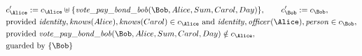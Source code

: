 \begin{align*}
&
c'_
{
\Alice
}
 := 
c_
{
\Alice
}
 \uplus 
\{
\mathit{\detokenize{
vote_pay_bond_bob
}}
(
\Bob
,
Alice
,
Sum
,
Carol
,
Day
)
\}
, \qquad 
c'_
{
\Bob
}
 := 
c_
{
\Bob
}
,\\
&
\text{provided } 
\mathit{\detokenize{
identity
}}
,
\mathit{\detokenize{
knows
}}
(
Alice
)
,
\mathit{\detokenize{
knows
}}
(
Carol
)
 \in c_
{
\Alice
}
 \text{ and } 
\mathit{\detokenize{
identity
}}
,
\mathit{\detokenize{
officer
}}
(
\Alice
)
,
\mathit{\detokenize{
person
}}
 \in c_
{
\Bob
}
,\\
&
\text{provided } 
\mathit{\detokenize{
vote_pay_bond_bob
}}
(
\Bob
,
Alice
,
Sum
,
Carol
,
Day
)
 \notin c_
{
\Alice
}
,\\
&
\text{guarded by } \{
\Bob
\}
\end{align*}

